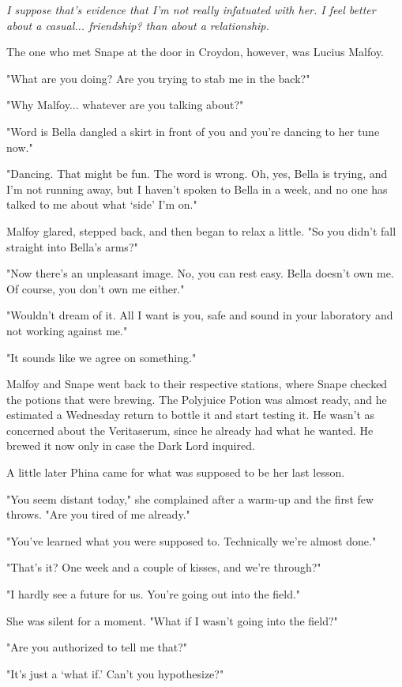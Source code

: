 \documentclass[a4paper,11pt]{article}
\begin{document}
\emph{I suppose that's evidence that I'm not really infatuated with her. I feel better about a casual... friendship? than about a relationship.}

The one who met Snape at the door in Croydon, however, was Lucius Malfoy.

"What are you doing? Are you trying to stab me in the back?"

"Why Malfoy... whatever are you talking about?"

"Word is Bella dangled a skirt in front of you and you're dancing to her tune now."

"Dancing. That might be fun. The word is wrong. Oh, yes, Bella is trying, and I'm not running away, but I haven't spoken to Bella in a week, and no one has talked to me about what `side' I'm on."

Malfoy glared, stepped back, and then began to relax a little. "So you didn't fall straight into Bella's arms?"

"Now there's an unpleasant image. No, you can rest easy. Bella doesn't own me. Of course, you don't own me either."

"Wouldn't dream of it. All I want is you, safe and sound in your laboratory and not working against me."

"It sounds like we agree on something."

Malfoy and Snape went back to their respective stations, where Snape checked the potions that were brewing. The Polyjuice Potion was almost ready, and he estimated a Wednesday return to bottle it and start testing it. He wasn't as concerned about the Veritaserum, since he already had what he wanted. He brewed it now only in case the Dark Lord inquired.

A little later Phina came for what was supposed to be her last lesson.

"You seem distant today," she complained after a warm-up and the first few throws. "Are you tired of me already."

"You've learned what you were supposed to. Technically we're almost done."

"That's it? One week and a couple of kisses, and we're through?"

"I hardly see a future for us. You're going out into the field."

She was silent for a moment. "What if I wasn't going into the field?"

"Are you authorized to tell me that?"

"It's just a `what if.' Can't you hypothesize?"
\end{document}
